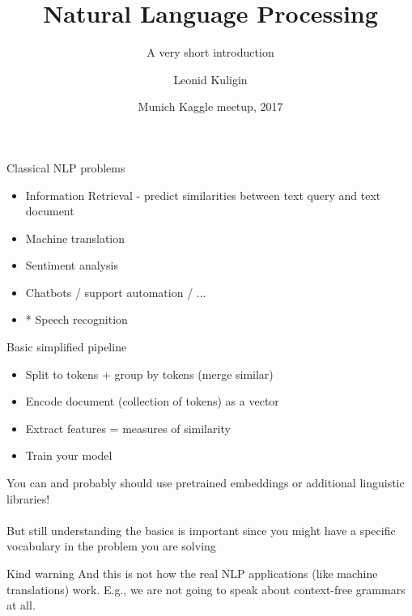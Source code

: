 \documentclass{beamer}
\title{Natural Language Processing}
\subtitle{A very short introduction}
\author{Leonid Kuligin\inst{1}}
\institute %
{
  \inst{1}%
  Scout24
}
\date{Munich Kaggle meetup, 2017}
\begin{document}
\begin{frame}
  \titlepage
\end{frame}

\begin{frame}{Classical NLP problems}
  \begin{itemize}
  \item {
    Information Retrieval - predict similarities between text query and text document
  }
  \item {
    Machine translation
  }
  \item {
    Sentiment analysis
  }
  \item {
    Chatbots / support automation / ...
  }
    \item {
    * Speech recognition
  }
  \end{itemize}
\end{frame}

\begin{frame}{Basic simplified pipeline}
  \begin{itemize}
  \item {
    Split to tokens + group by tokens (merge similar)
  }
  \item {   
    Encode document (collection of tokens) as a vector
  }
  \item {
    Extract features = measures of similarity
  }
  \item {
    Train your model
  }
  \end{itemize}
\end{frame}

\begin{frame}{}
\begin{block}{}
You can and probably should use pretrained embeddings or additional linguistic libraries! \\~\\
But still understanding the basics is important since you might have a specific vocabulary in the problem you are solving
\end{block}
\end{frame}

\begin{frame}{}
\begin{block}{Kind warning}
And this is not how the real NLP applications (like machine translations) work. E.g., we are not going to speak about context-free grammars at all.
\end{block}
\end{frame}
\end{document}
